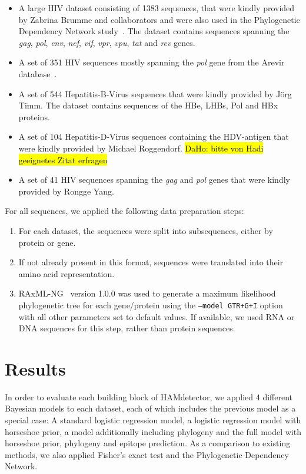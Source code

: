 \documentclass{bioinfo}
\begin{document}
\begin{methods}
\begin{itemize}
  \item A large HIV dataset consisting of 1383 sequences, that were kindly provided by Zabrina Brumme and collaborators and were also used in the Phylogenetic Dependency Network study~\citep{Carlson2008}. The dataset contains sequences spanning the \textit{gag}, \textit{pol}, \textit{env}, \textit{nef}, \textit{vif}, \textit{vpr}, \textit{vpu}, \textit{tat} and \textit{rev} genes.
  \item A set of 351 HIV sequences mostly spanning the \textit{pol} gene from the Arevir database~\citep{Roomp2006}.
  \item A set of 544 Hepatitis-B-Virus sequences that were kindly provided by Jörg Timm. The dataset contains sequences of the HBe, LHBs, Pol and HBx proteins.
  \item A set of 104 Hepatitis-D-Virus sequences containing the HDV-antigen that were kindly provided by Michael Roggendorf. \hl{DaHo: bitte von Hadi geeignetes Zitat erfragen}
  \item A set of 41 HIV sequences spanning the \textit{gag} and \textit{pol} genes that were kindly provided by Rongge Yang. 
\end{itemize}

For all sequences, we applied the following data preparation steps:

\begin{enumerate}
  \item For each dataset, the sequences were split into subsequences, either by protein or gene.
  \item If not already present in this format, sequences were translated into their amino acid representation.
  \item RAxML-NG~\citep{Kozlov2019} version 1.0.0 was used to generate a maximum likelihood phylogenetic tree for each gene/protein using the \texttt{--model GTR+G+I} option with all other parameters set to default values. If available, we used RNA or DNA sequences for this step, rather than protein sequences.
\end{enumerate}

\end{methods}

\section{Results} \label{sec:results}

In order to evaluate each building block of HAMdetector, we applied 4 different Bayesian models to each dataset, each of which includes the previous model as a special case:
A standard logistic regression model, a logistic regression model with horseshoe prior, a model additionally including phylogeny and the full model with horseshoe prior, phylogeny and epitope prediction.
As a comparison to existing methods, we also applied Fisher's exact test and the Phylogenetic Dependency Network.
\end{document}
